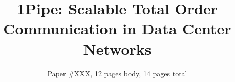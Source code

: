 \documentclass[sigconf]{acmart}
\numberwithin{equation}{section}
\begin{document}
\renewcommand\footnotetextcopyrightpermission[1]{} %


\acmDOI{}

\acmISBN{}


\acmPrice{}

\date{}

\title{1Pipe: Scalable Total Order Communication in Data Center Networks}

\author{Paper \#XXX, 12 pages body, 14 pages total}

\renewcommand{\shortauthors}{X.et al.}

\maketitle














{\footnotesize

}

%
\end{document}
